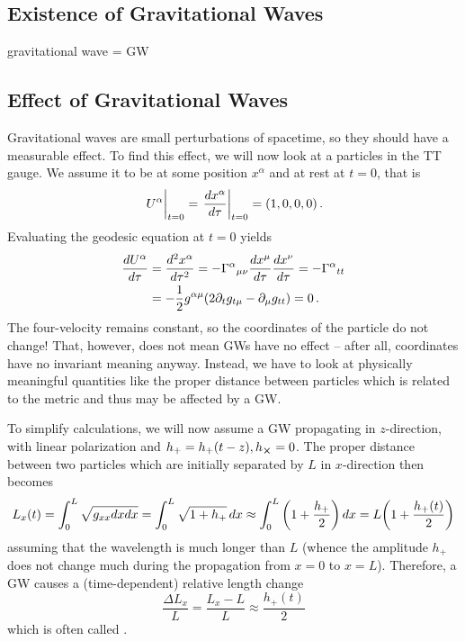 		\subsection{Existence of Gravitational Waves}

gravitational wave = GW



		\subsection{Effect of Gravitational Waves}
Gravitational waves are small perturbations of spacetime, so they should have a measurable effect. To find this effect, we will now look at a particles in the TT gauge. We assume it to be at some position $x^\alpha$ and at rest at $t = 0$, that is
\begin{equation*}
\eval{U^\alpha}_{t = 0} = \eval{\dv{x^\alpha}{\tau}}_{t = 0} = \qty(1, 0, 0, 0) \, .
\end{equation*}
Evaluating the geodesic equation at $t = 0$ yields
\begin{equation}
\begin{split}
\dv{U^\alpha}{\tau} &= \dv[2]{x^\alpha}{\tau} = - \Gamma^\alpha{}_{\mu \nu} \dv{x^\mu}{\tau} \dv{x^\nu}{\tau} = - \Gamma^\alpha{}_{tt}
\\
&= - \frac{1}{2} g^{\alpha \mu} \qty(2 \partial_t g_{t \mu} - \partial_\mu g_{tt}) = 0 \, .
\end{split}
\end{equation}
The four-velocity remains constant, so the coordinates of the particle do not change! That, however, does not mean GWs have no effect -- after all, coordinates have no invariant meaning anyway. Instead, we have to look at physically meaningful quantities like the proper distance between particles which is related to the metric and thus may be affected by a GW.

To simplify calculations, we will now assume a GW propagating in $z$-direction, with linear polarization and $h_+ = h_+(t - z), h_{\cross} = 0$. The proper distance between two particles which are initially separated by $L$ in $x$-direction then becomes
\begin{equation}
L_x(t) = \int_0^L \sqrt{g_{xx} dx dx} = \int_0^L \sqrt{1 + h_+} \, dx \approx \int_0^L \qty(1 + \frac{h_+}{2}) \, dx = L \qty(1 + \frac{h_+(t)}{2})
\end{equation}
assuming that the wavelength is much longer than $L$ (whence the amplitude $h_+$ does not change much during the propagation from $x = 0$ to $x = L$). Therefore, a GW causes a (time-dependent) relative length change
\begin{equation}
\frac{\Delta L_x}{L} = \frac{L_x - L}{L} \approx \frac{h_+(t)}{2}
\end{equation}
which is often called .


